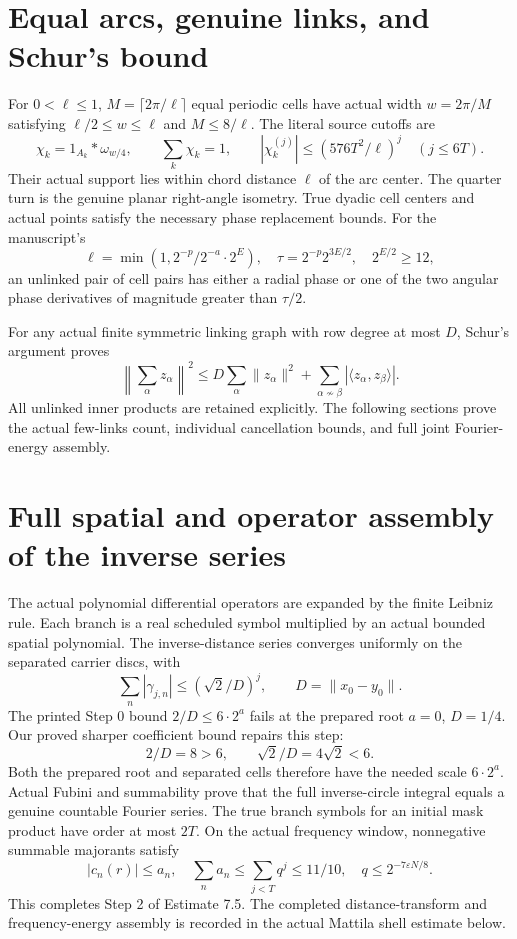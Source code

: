 \documentclass[11pt]{article}
\begin{document}
\section*{Equal arcs, genuine links, and Schur's bound}
For $0<\ell\le1$, $M=\lceil2\pi/\ell\rceil$ equal periodic cells have actual width
$w=2\pi/M$ satisfying $\ell/2\le w\le\ell$ and $M\le8/\ell$.
The literal source cutoffs are
\[
\chi_k=1_{A_k}*\omega_{w/4},\qquad \sum_k\chi_k=1,\qquad
|\chi_k^{(j)}|\le(576T^2/\ell)^j\quad(j\le6T).
\]
Their actual support lies within chord distance $\ell$ of the arc center. The
quarter turn is the genuine planar right-angle isometry. True dyadic cell
centers and actual points satisfy the necessary phase replacement bounds.
For the manuscript's
\[
\ell=\min(1,2^{-p}/2^{-a}\cdot2^E),\quad
\tau=2^{-p}2^{3E/2},\quad 2^{E/2}\ge12,
\]
an unlinked pair of cell pairs has either a radial phase or one of the two
angular phase derivatives of magnitude greater than $\tau/2$.

For any actual finite symmetric linking graph with row degree at most $D$,
Schur's argument proves
\[
\left\|\sum_\alpha z_\alpha\right\|^2\le
D\sum_\alpha\|z_\alpha\|^2+
\sum_{\alpha\not\sim\beta}|\langle z_\alpha,z_\beta\rangle|.
\]
All unlinked inner products are retained explicitly. The following sections
prove the actual few-links count, individual cancellation bounds, and full
joint Fourier-energy assembly.

\newpage
\section*{Full spatial and operator assembly of the inverse series}
The actual polynomial differential operators are expanded by the finite
Leibniz rule. Each branch is a real scheduled symbol multiplied by an actual
bounded spatial polynomial. The inverse-distance series converges uniformly
on the separated carrier discs, with
\[
\sum_n|\gamma_{j,n}|\le(\sqrt2/D)^j,\qquad D=\lVert x_0-y_0\rVert.
\]
The printed Step 0 bound $2/D\le6\cdot2^a$ fails at the prepared root
$a=0$, $D=1/4$. Our proved sharper coefficient bound repairs this step:
\[
2/D=8>6,\qquad \sqrt2/D=4\sqrt2<6.
\]
Both the prepared root and separated cells therefore have the needed scale
$6\cdot2^a$. Actual Fubini and summability prove that the full inverse-circle
integral equals a genuine countable Fourier series. The true branch symbols
for an initial mask product have order at most $2T$.
On the actual frequency window, nonnegative summable majorants satisfy
\[
|c_n(r)|\le a_n,\quad \sum_n a_n\le\sum_{j<T}q^j\le11/10,
\quad q\le2^{-7\varepsilon N/8}.
\]
This completes Step 2 of Estimate 7.5. The completed distance-transform and
frequency-energy assembly is recorded in the actual Mattila shell estimate
below.
\end{document}
